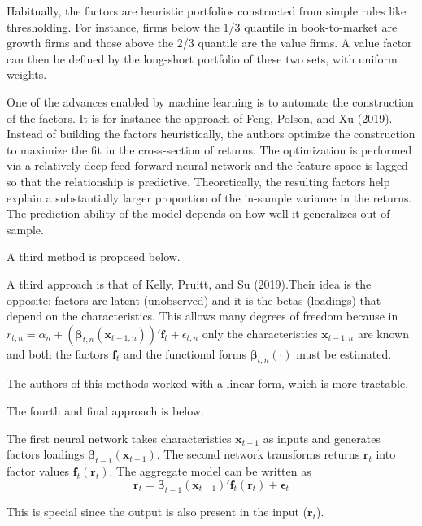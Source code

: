 Habitually, the factors are heuristic portfolios constructed from simple rules like thresholding. For instance, firms below the 1/3 quantile in book-to-market are growth firms and those above the 2/3 quantile are the value firms. A value factor can then be defined by the long-short portfolio of these two sets, with uniform weights.

One of the advances enabled by machine learning is to automate the construction of the factors. It is for instance the approach of Feng, Polson, and Xu (2019). Instead of building the factors heuristically, the authors optimize the construction to maximize the fit in the cross-section of returns. The optimization is performed via a relatively deep feed-forward neural network and the feature space is lagged so that the relationship is predictive. Theoretically, the resulting factors help explain a substantially larger proportion of the in-sample variance in the returns. The prediction ability of the model depends on how well it generalizes out-of-sample.

A third method is proposed below.
\begin{thm}
  A third approach is that of Kelly, Pruitt, and Su (2019).Their idea is the opposite: factors are latent (unobserved) and it is the betas (loadings) that depend on the characteristics. This allows many degrees of freedom because in $r_{t,n} = \alpha _{n} + (\boldsymbol{\beta }_{t,n}(\mathbf{x}_{t-1,n}))'\mathbf{f}_{t} + \epsilon_{t,n}$ only the characteristics $\mathbf{x}_{t-1,n}$ are known and both the factors $\mathbf{f}_{t}$ and the functional forms $\boldsymbol{\beta}_{t,n}( \cdot )$ must be estimated. 
\end{thm}

The authors of this methods worked with a linear form, which is more tractable.

The fourth and final approach is below.
\begin{thm}
  The first neural network takes characteristics $\mathbf{x}_{t-1}$ as inputs and generates factors loadings $\boldsymbol{\beta }_{t-1}(\mathbf{x}_{t-1})$. The second network transforms returns $\mathbf{r}_{t}$ into factor values $\mathbf{f}_{t}(\mathbf{r}_{t})$. The aggregate model can be written as
  \begin{equation}
    \mathbf{r}_{t} = \boldsymbol{\beta }_{t-1}(\mathbf{x}_{t-1})'\mathbf{f}_{t}(\mathbf{r}_{t}) + \boldsymbol{\epsilon}_{t} \label{eq:3.7}
  \end{equation}
  
  This is special since the output is also present in the input ($\mathbf{r}_{t}$).
\end{thm}

